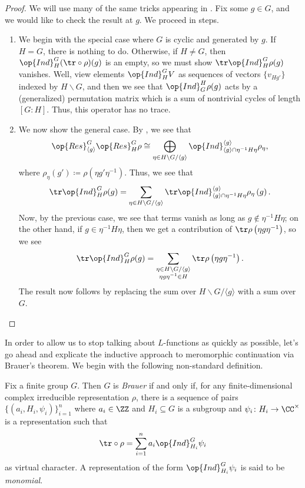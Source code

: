 \documentclass[../thesis.tex]{subfiles}
\begin{document}
\begin{proof}
	We will use many of the same tricks appearing in . Fix some $g\in G$, and we would like to check the result at $g$. We proceed in steps.
	\begin{enumerate}
		\item We begin with the special case where $G$ is cyclic and generated by $g$. If $H=G$, there is nothing to do. Otherwise, if $H\ne G$, then $\op{Ind}^G_H({\tr\circ\rho})(g)$ is an empty, so we must show $\tr\op{Ind}_H^G\rho(g)$ vanishes. Well, view elements $\op{Ind}_H^GV$ as sequences of vectors $\{v_{Hg'}\}$ indexed by $H\backslash G$, and then we see that $\op{Ind}_G^H\rho(g)$ acts by a (generalized) permutation matrix which is a sum of nontrivial cycles of length $[G:H]$. Thus, this operator has no trace.
		\item We now show the general case. By , we see that
		\[\op{Res}^G_{\langle g\rangle}\op{Res}^G_H\rho\cong\bigoplus_{\eta\in H\backslash G/\langle g\rangle}\op{Ind}^{\langle g\rangle}_{\langle g\rangle\cap\eta^{-1}H\eta}\rho_\eta,\]
		where $\rho_\eta(g')\coloneqq\rho\left(\eta g'\eta^{-1}\right)$. Thus, we see that
		\[\tr\op{Ind}_H^G\rho(g)=\sum_{\eta\in H\backslash G/\langle g\rangle}\tr\op{Ind}_{\langle g\rangle\cap\eta^{-1}H\eta}^{\langle g\rangle}\rho_\eta\left(g\right).\]
		Now, by the previous case, we see that terms vanish as long as $g\notin\eta^{-1}H\eta$; on the other hand, if $g\in\eta^{-1}H\eta$, then we get a contribution of $\tr\rho\left(\eta g\eta^{-1}\right)$, so we see
		\[\tr\op{Ind}_H^G\rho(g)=\sum_{\substack{\eta\in H\backslash G/\langle g\rangle\\\eta g\eta^{-1}\in H}}\tr\rho\left(\eta g\eta^{-1}\right).\]
		The result now follows by replacing the sum over $H\backslash G/\langle g\rangle$ with a sum over $G$.
		\qedhere
	\end{enumerate}
\end{proof}
In order to allow us to stop talking about $L$-functions as quickly as possible, let's go ahead and explicate the inductive approach to meromorphic continuation via Brauer's theorem. We begin with the following non-standard definition.
\begin{definition}[Brauer] 
	Fix a finite group $G$. Then $G$ is \textit{Brauer} if and only if, for any finite-dimensional complex irreducible representation $\rho$, there is a sequence of pairs $\{(a_i,H_i,\psi_i)\}_{i=1}^n$ where $a_i\in\ZZ$ and $H_i\subseteq G$ is a subgroup and $\psi_i\colon H_i\to\CC^\times$ is a representation such that
	\[{\tr}\circ\rho=\sum_{i=1}^na_i\op{Ind}_{H_i}^G\psi_i\]
	as virtual character. A representation of the form $\op{Ind}_{H_i}^G\psi_i$ is said to be \textit{monomial}.
\end{definition}
\end{document}
